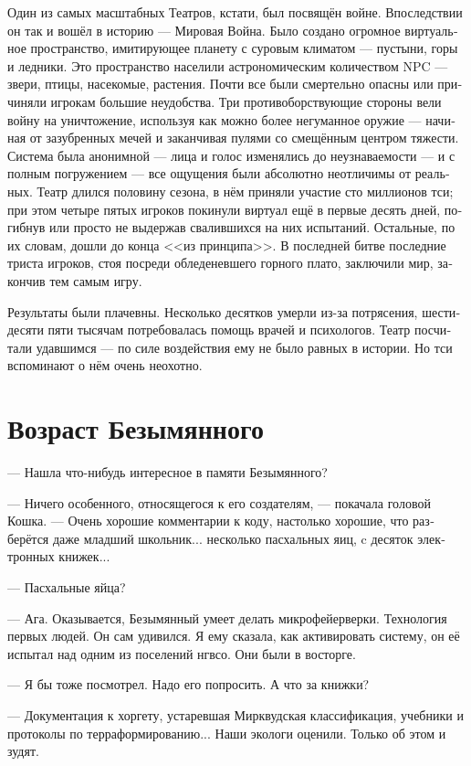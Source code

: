 \documentclass[a4paper,12pt,fleqn]{book}\usepackage{polyglossia}\setdefaultlanguage[babelshorthands=true]{russian}\setotherlanguage{english}\defaultfontfeatures{Ligatures=TeX,Mapping=tex-text}\usepackage{xcolor}\newcommand{\ml}[3]{#2}
\begin{document}
{Один из самых масштабных Театров, кстати, был посвящён войне.
Впоследствии он так и вошёл в историю --- Мировая Война.
Было создано огромное виртуальное пространство, имитирующее планету с суровым климатом --- пустыни, горы и ледники.
Это пространство населили астрономическим количеством NPC --- звери, птицы, насекомые, растения.
Почти все были смертельно опасны или причиняли игрокам большие неудобства.
Три противоборствующие стороны вели войну на уничтожение, используя как можно более негуманное оружие --- начиная от зазубренных мечей и заканчивая пулями со смещённым центром тяжести.
Система была анонимной --- лица и голос изменялись до неузнаваемости --- и с полным погружением --- все ощущения были абсолютно неотличимы от реальных.
Театр длился половину сезона, в нём приняли участие сто миллионов тси;
при этом четыре пятых игроков покинули виртуал ещё в первые десять дней, погибнув или просто не выдержав свалившихся на них испытаний.
Остальные, по их словам, дошли до конца <<из принципа>>.
В последней битве последние триста игроков, стоя посреди обледеневшего горного плато, заключили мир, закончив тем самым игру.

Результаты были плачевны.
Несколько десятков умерли из-за потрясения, шестидесяти пяти тысячам потребовалась помощь врачей и психологов.
Театр посчитали удавшимся --- по силе воздействия ему не было равных в истории.
Но тси вспоминают о нём очень неохотно.

\section{Возраст Безымянного}

--- Нашла что-нибудь интересное в памяти Безымянного?

--- Ничего особенного, относящегося к его создателям, --- покачала головой Кошка.
--- Очень хорошие комментарии к коду, настолько хорошие, что разберётся даже младший школьник... несколько пасхальных яиц, c десяток электронных книжек...

--- Пасхальные яйца?

--- Ага.
Оказывается, Безымянный умеет делать микрофейерверки.
Технология первых людей.
Он сам удивился.
Я ему сказала, как активировать систему, он её испытал над одним из поселений нгвсо.
Они были в восторге.

--- Я бы тоже посмотрел.
Надо его попросить.
А что за книжки?

--- Документация к хоргету, устаревшая Мирквудская классификация, учебники и протоколы по терраформированию...
Наши экологи оценили.
Только об этом и зудят.

}
\end{document}

